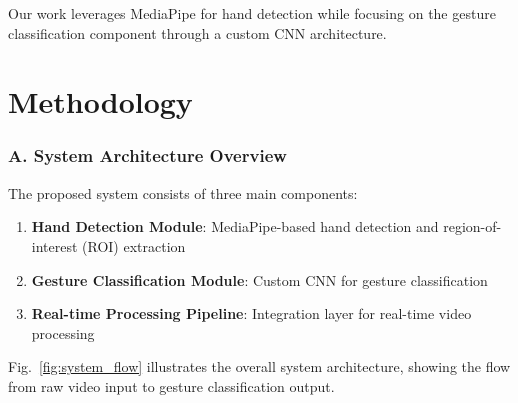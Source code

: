 \documentclass[11pt,a4paper,twoside]{article}
\providecommand{\tightlist}{%
  \setlength{\itemsep}{0pt}\setlength{\parskip}{0pt}}
\begin{document}
Our work leverages MediaPipe for hand detection while focusing on the
gesture classification component through a custom CNN architecture.

\section{Methodology}\label{iii.-methodology}

\subsubsection{A. System Architecture
Overview}\label{a.-system-architecture-overview}

The proposed system consists of three main components:

\begin{enumerate}
\def\labelenumi{\arabic{enumi}.}
\tightlist
\item
  \textbf{Hand Detection Module}: MediaPipe-based hand detection and
  region-of-interest (ROI) extraction
\item
  \textbf{Gesture Classification Module}: Custom CNN for gesture
  classification
\item
  \textbf{Real-time Processing Pipeline}: Integration layer for
  real-time video processing
\end{enumerate}

Fig.~\ref{fig:system_flow} illustrates the overall system architecture, showing the flow from raw video input to gesture classification output.

\end{document}
